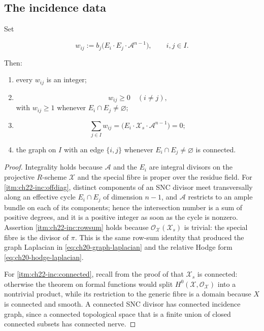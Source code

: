 \subsection{The incidence data}

\begin{lemma}
\label{lem:ch22-incidence-signs}
Set

\[
 w_{ij}:=b_j\bigl(E_i\cdot E_j\cdot\mathcal A^{n-1}\bigr),
 \qquad i,j\in I .
\tag{22.21}\label{eq:ch22-incidence-weights}
\]

Then:
\begin{enumerate}
\item\label{itm:ch22-inc:integrality} every $w_{ij}$ is an integer;
\item\label{itm:ch22-inc:offdiag}
\[
 w_{ij}\geq0\quad(i\neq j),
\tag{22.22}\label{eq:ch22-off-diagonal-positive}
\]
with $w_{ij}\geq1$ whenever $E_i\cap E_j\neq\varnothing$;
\item\label{itm:ch22-inc:rowsum}
\[
 \sum_{j\in I}w_{ij}
       =\bigl(E_i\cdot\mathcal X_s\cdot\mathcal A^{n-1}\bigr)=0;
\tag{22.23}\label{eq:ch22-row-sum-zero}
\]
\item\label{itm:ch22-inc:connected} the graph on $I$ with an edge
$\{i,j\}$ whenever $E_i\cap E_j\neq\varnothing$ is connected.
\end{enumerate}
\end{lemma}

\begin{proof}
Integrality holds because $\mathcal A$ and the $E_i$ are integral
divisors on the projective $R$-scheme $\mathcal X$ and the special fibre
is proper over the residue field.  For
\cref{itm:ch22-inc:offdiag}, distinct components of an SNC divisor meet
transversally along an effective cycle $E_i\cap E_j$ of dimension
$n-1$, and $\mathcal A$ restricts to an ample bundle on each of its
components; hence the intersection number is a sum of positive degrees, and
it is a positive integer as soon as the cycle is nonzero.  Assertion
\cref{itm:ch22-inc:rowsum} holds because
$\mathcal O_{\mathcal X}(\mathcal X_s)$ is trivial: the special fibre is
the divisor of $\pi$.  This is the same row-sum identity that produced the
graph Laplacian in \eqref{eq:ch20-graph-laplacian} and the relative Hodge
form \eqref{eq:ch20-hodge-laplacian}.

For \cref{itm:ch22-inc:connected}, recall from the proof of
 that $\mathcal X_s$ is connected: otherwise the
theorem on formal functions would split
$H^0(\mathcal X,\mathcal O_{\mathcal X})$ into a nontrivial product, while
its restriction to the generic fibre is a domain because $X$ is connected
and smooth.  A connected SNC divisor has connected incidence graph, since a
connected topological space that is a finite union of closed connected
subsets has connected nerve.
\end{proof}

